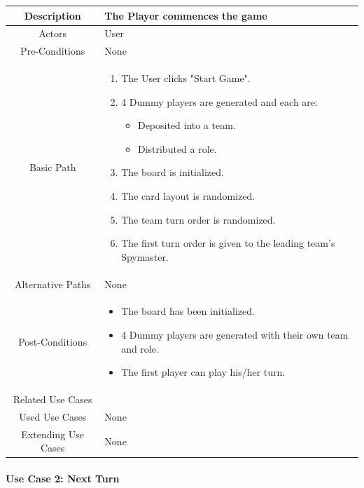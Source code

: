 \documentclass[10pt, a4paper]{article}
\begin{document}
	\begin{center}
		\begin{tabular}{ |c|p{10cm}| } 
			\hline
			Description & The Player commences the game  \\
			\hline 
			Actors & User \\
			\hline  
			Pre-Conditions & None \\
			\hline  
			Basic Path & 
			\begin{enumerate}
				\item The User clicks "Start Game".
				\item 4 Dummy players are generated and each are:
				\begin{itemize}
					\item Deposited into a team.
					\item Distributed a role.
				\end{itemize}
				\item The board is initialized.
				\item The card layout is randomized.
				\item The team turn order is randomized.
				\item The first turn order is given to the leading team's Spymaster.
			\end{enumerate}\\
			\hline
			Alternative Paths & None \\
			\hline
			Post-Conditions & 
			\begin{itemize}[noitemsep,topsep=0pt]
				\item The board has been initialized.
				\item 4 Dummy players are generated with their own team and role.
				\item The first player can play his/her turn.
			\end{itemize}\\
			\hline 
			Related Use Cases & \\
			\hline 
			Used Use Cases & None\\
			\hline 
			Extending Use Cases & None \\
			\hline 
		\end{tabular}
	\end{center}
	
	\newpage
	
	\paragraph{Use Case 2: Next Turn}
	
\end{document}
